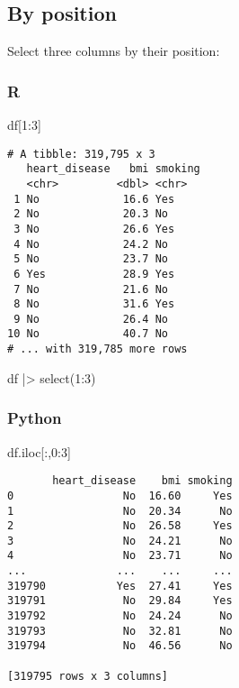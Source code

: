 \documentclass[
  letterpaper,
  DIV=11,
  numbers=noendperiod]{scrreprt}
\newenvironment{Shaded}{\begin{snugshade}}{\end{snugshade}}
\newcommand{\DecValTok}[1]{\textcolor[rgb]{0.68,0.00,0.00}{#1}}
\newcommand{\FunctionTok}[1]{\textcolor[rgb]{0.28,0.35,0.67}{#1}}
\newcommand{\NormalTok}[1]{\textcolor[rgb]{0.00,0.46,0.62}{#1}}
\newcommand{\SpecialCharTok}[1]{\textcolor[rgb]{0.37,0.37,0.37}{#1}}
\begin{document}
\hypertarget{by-position}{%
\subsection{By position}\label{by-position}}

Select three columns by their position:

\hypertarget{r-17}{%
\subsubsection{R}\label{r-17}}

\begin{Shaded}
\begin{Highlighting}[]
\NormalTok{df[}\DecValTok{1}\SpecialCharTok{:}\DecValTok{3}\NormalTok{]}
\end{Highlighting}
\end{Shaded}

\begin{verbatim}
# A tibble: 319,795 x 3
   heart_disease   bmi smoking
   <chr>         <dbl> <chr>  
 1 No             16.6 Yes    
 2 No             20.3 No     
 3 No             26.6 Yes    
 4 No             24.2 No     
 5 No             23.7 No     
 6 Yes            28.9 Yes    
 7 No             21.6 No     
 8 No             31.6 Yes    
 9 No             26.4 No     
10 No             40.7 No     
# ... with 319,785 more rows
\end{verbatim}

\begin{Shaded}
\begin{Highlighting}[]
\NormalTok{df }\SpecialCharTok{|\textgreater{}} \FunctionTok{select}\NormalTok{(}\DecValTok{1}\SpecialCharTok{:}\DecValTok{3}\NormalTok{)}
\end{Highlighting}
\end{Shaded}

\hypertarget{python-17}{%
\subsubsection{Python}\label{python-17}}

\begin{Shaded}
\begin{Highlighting}[]
\NormalTok{df.iloc[:,}\DecValTok{0}\NormalTok{:}\DecValTok{3}\NormalTok{]}
\end{Highlighting}
\end{Shaded}

\begin{verbatim}
       heart_disease    bmi smoking
0                 No  16.60     Yes
1                 No  20.34      No
2                 No  26.58     Yes
3                 No  24.21      No
4                 No  23.71      No
...              ...    ...     ...
319790           Yes  27.41     Yes
319791            No  29.84     Yes
319792            No  24.24      No
319793            No  32.81      No
319794            No  46.56      No

[319795 rows x 3 columns]
\end{verbatim}
\end{document}
